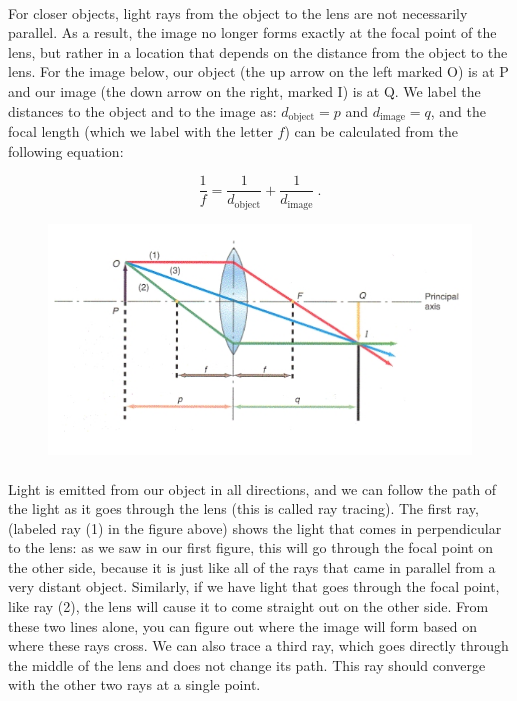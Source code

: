 \documentclass[12pt]{article}%
\begin{document}
\paragraph{}
For closer objects, light rays from the object to the lens are not necessarily parallel. As a result, the image no longer forms exactly at the focal point of the lens, but rather in a location that depends on the distance from the object to the lens. For the image below, our object (the up arrow on the left marked O) is at P and our image (the down arrow on the right, marked I) is at Q. We label the distances to the object and to the image as: $d_\text{object} = p$ and $d_\text{image} = q$, and the focal length (which we label with the letter $f$) can be calculated from the following equation:
 
\begin{equation}
\frac{1}{f} = \frac{1}{d_\text{object}}+\frac{1}{d_\text{image}} \ .
\end{equation}
 
\begin{figure}[ht!]
\begin{center}
\includegraphics[scale=.6]{Optics_fig2.png}
\end{center}
\end{figure}
 
\paragraph{}
Light is emitted from our object in all directions, and we can follow the path of the light as it goes through the lens (this is called ray tracing). The first ray, (labeled ray (1) in the figure above) shows the light that comes in perpendicular to the lens: as we saw in our first figure, this will go through the focal point on the other side, because it is just like all of the rays that came in parallel from a very distant object. Similarly, if we have light that goes through the focal point, like ray (2), the lens will cause it to come straight out on the other side. From these two lines alone, you can figure out where the image will form based on where these rays cross. We can also trace a third ray, which goes directly through the middle of the lens and does not change its path. This ray should converge with the other two rays at a single point.
 
\end{document}
